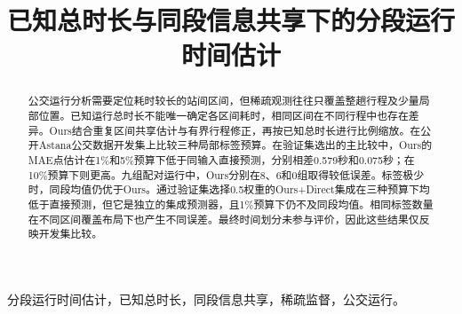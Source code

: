 \documentclass[journal]{IEEEtran}
\begin{document}
\title{已知总时长与同段信息共享下的分段运行时间估计}
\author{}
\maketitle
\begin{abstract}
公交运行分析需要定位耗时较长的站间区间，但稀疏观测往往只覆盖整趟行程及少量局部位置。已知运行总时长不能唯一确定各区间耗时，相同区间在不同行程中也存在差异。Ours结合重复区间共享估计与有界行程修正，再按已知总时长进行比例缩放。在公开Astana公交数据开发集上比较三种局部标签预算。在验证集选出的主比较中，Ours的MAE点估计在1\%和5\%预算下低于同输入直接预测，分别相差0.579秒和0.075秒；在10\%预算下则更高。九组配对运行中，Ours分别在8、6和0组取得较低误差。标签极少时，同段均值仍优于Ours。通过验证集选择0.5权重的Ours+Direct集成在三种预算下均低于直接预测，但它是独立的集成预测器，且1\%预算下仍不及同段均值。相同标签数量在不同区间覆盖布局下也产生不同误差。最终时间划分未参与评价，因此这些结果仅反映开发集比较。
\end{abstract}
\begin{IEEEkeywords}
分段运行时间估计，已知总时长，同段信息共享，稀疏监督，公交运行。
\end{IEEEkeywords}







\end{document}
